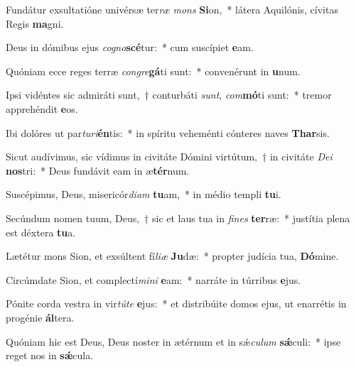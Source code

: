 \item Fundátur exsultatióne univérsæ ter\textit{ræ} \textit{mons} \textbf{Si}on,~* látera Aquilónis, cívitas Regis \textbf{ma}gni.
\item Deus in dómibus ejus \textit{co}\textit{gno}\textbf{scé}tur:~* cum suscípiet \textbf{e}am.
\item Quóniam ecce reges terræ \textit{con}\textit{gre}\textbf{gá}ti sunt:~* convenérunt in \textbf{u}num.
\item Ipsi vidéntes sic admiráti sunt,~† conturbáti \textit{sunt}, \textit{com}\textbf{mó}ti sunt:~* tremor apprehéndit \textbf{e}os.
\item Ibi dolóres ut par\textit{tu}\textit{ri}\textbf{én}tis:~* in spíritu veheménti cónteres naves \textbf{Thar}sis.
\item Sicut audívimus, sic vídimus in civitáte Dómini virtútum,~† in civitáte \textit{De}\textit{i} \textbf{nos}tri:~* Deus fundávit eam in æ\textbf{tér}num.
\item Suscépimus, Deus, misericór\textit{di}\textit{am} \textbf{tu}am,~* in médio templi \textbf{tu}i.
\item Secúndum nomen tuum, Deus,~† sic et laus tua in \textit{fi}\textit{nes} \textbf{ter}ræ:~* justítia plena est déxtera \textbf{tu}a.
\item Lætétur mons Sion, et exsúltent fí\textit{li}\textit{æ} \textbf{Ju}dæ:~* propter judícia tua, \textbf{Dó}mine.
\item Circúmdate Sion, et complectí\textit{mi}\textit{ni} \textbf{e}am:~* narráte in túrribus \textbf{e}jus.
\item Pónite corda vestra in vir\textit{tú}\textit{te} \textbf{e}jus:~* et distribúite domos ejus, ut enarrétis in progénie \textbf{ál}tera.
\item Quóniam hic est Deus, Deus noster in ætérnum et in sǽ\textit{cu}\textit{lum} \textbf{sǽ}culi:~* ipse reget nos in \textbf{sǽ}cula.
